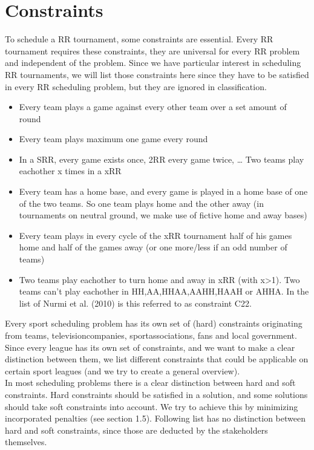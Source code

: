 \section{Constraints}
To schedule a RR tournament, some constraints are essential. Every RR tournament requires these constraints, they are universal for every RR problem and independent of the problem. Since we have particular interest in scheduling RR tournaments, we will list those constraints here since they have to be satisfied in every RR scheduling problem, but they are ignored in classification.
\\[5px]
\begin{itemize}
\item{Every team plays a game against every other team over a set amount of round}
\item{Every team plays maximum one game every round}
\item{In a SRR, every game exists once, 2RR every game twice, … Two teams play eachother x times in a xRR}
\item{Every team has a home base, and every game is played in a home base of one of the two teams. So one team plays home and the other away (in tournaments on neutral ground, we make use of fictive home and away bases)}
\item{Every team plays in every cycle of the xRR tournament half of his games home and half of the games away (or one more/less if an odd number of teams)}
\item{Two teams play eachother to turn home and away in xRR (with x>1). Two teams can’t play eachother in HH,AA,HHAA,AAHH,HAAH or AHHA. In the list of Nurmi et al. (2010) is this referred to as constraint C22.}

\end{itemize}
Every sport scheduling problem has its own set of (hard) constraints originating from teams, televisioncompanies, sportassociations, fans and local government. Since every league has its own set of constraints, and we want to make a clear distinction between them, we list different constraints that could be applicable on certain sport leagues (and we try to create a general overview).
\\[5px]
In most scheduling problems there is a clear distinction between hard and soft constraints. Hard constraints should be satisfied in a solution, and some solutions should take soft constraints into account. We try to achieve this by minimizing incorporated penalties (see section 1.5). Following list has no distinction between hard and soft constraints, since those are deducted by the stakeholders themselves. 

